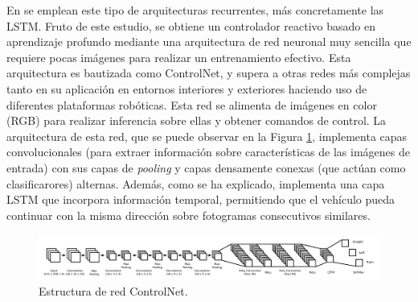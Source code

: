 En \cite{reactive-ground} se emplean este tipo de arquitecturas recurrentes, más concretamente las LSTM. Fruto de este estudio, se obtiene un controlador reactivo basado en aprendizaje profundo mediante una arquitectura de red neuronal muy sencilla que requiere pocas imágenes para realizar un entrenamiento efectivo. Esta arquitectura es bautizada como ControlNet, y supera a otras redes más complejas tanto en su aplicación en entornos interiores y exteriores haciendo uso de diferentes plataformas robóticas. Esta red se alimenta de imágenes en color (RGB) para realizar inferencia sobre ellas y obtener comandos de control. La arquitectura de esta red, que se puede observar en la Figura \ref{fig.controlnet}, implementa capas convolucionales (para extraer información sobre características de las imágenes de entrada) con sus capas de \textit{pooling} y capas densamente conexas (que actúan como clasificarores) alternas. Además, como se ha explicado, implementa una capa LSTM que incorpora información temporal, permitiendo que el vehículo pueda continuar con la misma dirección sobre fotogramas consecutivos similares.

\begin{figure}
\begin{center}
	\includegraphics[width=1.2\textwidth]{img/controlnet.png}
   \caption{Estructura de red ControlNet.}
	\label{fig.controlnet}
\end{center}
\end{figure}


